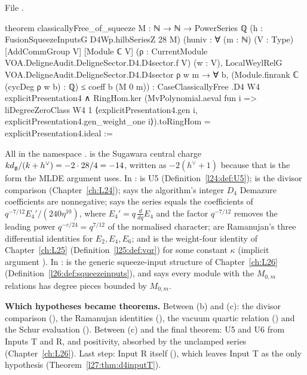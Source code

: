 \noindent File .
\begin{leancode}
theorem classicallyFree_of_squeeze {M : ℕ → ℕ → PowerSeries ℚ}
    (h : FusionSqueezeInputsG D4Wp.hilbSeriesZ 28 M)
    (huniv : ∀ (m : ℕ) (V : Type) [AddCommGroup V] [Module ℂ V]
      (ρ : CurrentModule VOA.DeligneAudit.DeligneSector.D4.D4sector.f V) (w : V),
      LocalWeylRelG VOA.DeligneAudit.DeligneSector.D4.D4sector ρ w m →
        ∀ b, (Module.finrank ℂ (cycDeg ρ w b) : ℚ) ≤ coeff b (M 0 m)) :
    CaseClassicallyFree .D4 W4 explicitPresentation4 ∧
      RingHom.ker (MvPolynomial.aeval fun i =>
        liDegreeZeroClass W4 1 ⟨explicitPresentation4.gen i,
          explicitPresentation4.gen_weight_one i⟩).toRingHom = explicitPresentation4.ideal :=
\end{leancode}

\begin{dictionary}
All in the namespace .  is the Sugawara central charge
$kd_{\mathfrak g}/(k+h^\vee)=-2\cdot28/4=-14$, written as $-2(h^\vee+1)$ because that is the form the MLDE argument uses. In
:  is U5 (Definition~\ref{l24:def:U5});  is the
divisor comparison (Chapter~\ref{ch:L24});  says the algorithm's integer $D_4$ Demazure coefficients are
nonnegative;  says the series  equals the coefficients of $q^{-7/12}E_4'/(240\eta^{10})$, where
$E_4'=q\,\frac{d}{dq}E_4$ and the factor $q^{-7/12}$ removes the leading power $q^{-c/24}=q^{7/12}$ of the normalised character;
 are Ramanujan's three differential identities for $E_2,E_4,E_6$; and  is
the weight-four identity of Chapter~\ref{ch:L25} (Definition~\ref{l25:def:vqr}) for some constant $\kappa$ (implicit argument
). In :  is the generic squeeze-input structure of
Chapter~\ref{ch:L26} (Definition~\ref{l26:def:squeezeinputs}), and  says every module with the $M_{0,m}$ relations has degree
pieces bounded by $M_{0,m}$.

\textbf{Which hypotheses became theorems.} Between (b) and (c): the divisor comparison (),
the Ramanujan identities (), the vacuum quartic relation () and the Schur
evaluation (). Between (c) and the final theorem: U5 and U6 from Inputs T and R, and positivity, absorbed by the
unclamped series (Chapter~\ref{ch:L26}). Last step: Input R itself (), which leaves Input T as the
only hypothesis (Theorem~\ref{l27:thm:d4inputT}).
\end{dictionary}

